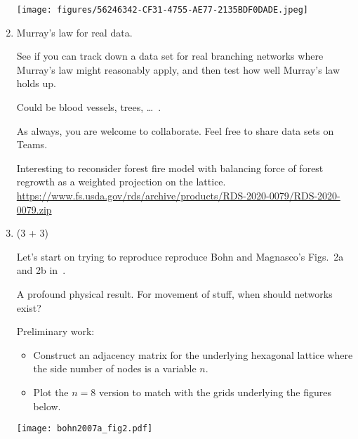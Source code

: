 \begin{enumerate}
   \begin{center}
   \texttt{[image: figures/56246342-CF31-4755-AE77-2135BDF0DADE.jpeg]}
   \end{center}

   \solutionend

\item
  Murray's law for real data.

  See if you can track down a data set for real branching networks
  where Murray's law might reasonably apply, and then test how
  well Murray's law holds up.

  Could be blood vessels, trees, \ldots~\cite{sherman1981a,mcculloh2003a,mcculloh2004a}.

  As always, you are welcome to collaborate.
  Feel free to share data sets on Teams.

  
   \solutionstart

   Interesting to reconsider forest fire model with balancing force of forest regrowth as a weighted projection on the lattice. \url{https://www.fs.usda.gov/rds/archive/products/RDS-2020-0079/RDS-2020-0079.zip}

   \solutionend

  


\item (3 + 3)

  Let's start on trying to reproduce
  reproduce Bohn and Magnasco's Figs.~2a and 2b in~\cite{bohn2007a}.

  A profound physical result. For movement of stuff, when should networks exist?

  Preliminary work:

  \begin{itemize}
  \item 
    Construct an adjacency matrix for
    the underlying hexagonal lattice where
    the side number of nodes is a variable $n$.
  \item
    Plot the $n=8$ version to match with the
    grids underlying the figures below.
  \end{itemize}

  \texttt{[image: bohn2007a\_fig2.pdf]}


  
\end{enumerate}